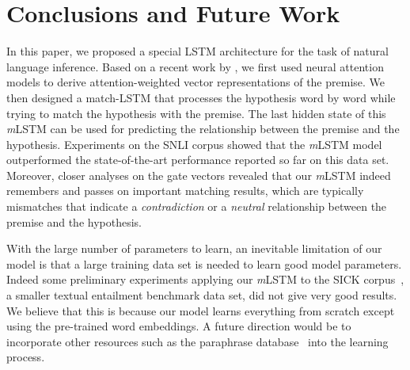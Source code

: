 \documentclass[11pt,letterpaper]{article}
\begin{document}
 \section{Conclusions and Future Work}

In this paper, we proposed a special LSTM architecture for the task of natural language inference.
Based on a recent work by , we first used neural attention models to derive attention-weighted vector representations of the premise.
We then designed a match-LSTM that processes the hypothesis word by word while trying to match the hypothesis with the premise.
The last hidden state of this \emph{m}LSTM can be used for predicting the relationship between the premise and the hypothesis.
Experiments on the SNLI corpus showed that the \emph{m}LSTM model outperformed the state-of-the-art performance reported so far on this data set.
Moreover, closer analyses on the gate vectors revealed that our \emph{m}LSTM indeed remembers and passes on important matching results, which are typically mismatches that indicate a \emph{contradiction} or a \emph{neutral} relationship between the premise and the hypothesis.

With the large number of parameters to learn, an inevitable limitation of our model 
is that a large training data set is needed to learn good model parameters.
Indeed some preliminary experiments applying our \emph{m}LSTM to the SICK corpus~\cite{marelli:lrec14}, a smaller textual entailment benchmark data set, did not give very good results.
We believe that this is because our model learns everything from scratch except using the pre-trained word embeddings.
A future direction would be to incorporate other resources such as the paraphrase database~\cite{ganitkevitch:naacl13} into the learning process. 



\end{document}
